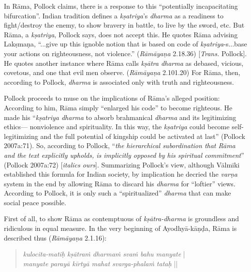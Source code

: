 In Rāma, Pollock claims, there is a response to this “potentially incapacitating bifurcation”. Indian tradition defines a \hbox{{\sl kṣatriya}’s} {\sl dharma} as a readiness to fight/destroy the enemy, to show bravery in battle, to live by the sword, etc. But Rāma, a {\sl kṣatriya}, Pollock says, does not accept this. He quotes Rāma advising Lakṣmaṇa, “...give up this ignoble notion that is based on code of {\sl kṣatriya}-s...base your actions on righteousness, not violence.” ({\sl Rāmāyaṇa} 2.18.36) [{\sl Trans.} Pollock]. He quotes another instance where Rāma calls {\sl kṣātra dharma} as debased, vicious, covetous, and one that evil men observe. ({\sl Rāmāyaṇa} 2.101.20) For Rāma, then, according to Pollock, {\sl dharma} is associated only with truth and righteousness.

Pollock proceeds to muse on the implications of Rāma’s alleged position: According to him, Rāma simply “enlarged his code” to become righteous. He made his “{\sl kṣatriya dharma} to absorb brahmanical {\sl dharma} and its legitimizing ethics--- nonviolence and spirituality. In this way, the {\sl kṣatriya} could become self-legitimizing and the full potential of kingship could be activated at last” (Pollock 2007a:71). So, according to Pollock, “{\sl the hierarchical subordination that Rāma and the text explicitly upholds, is implicitly opposed by his spiritual commitment}” (Pollock 2007a:72) [{\sl italics ours}]. Summarizing Pollock's view, although Vālmīki established this formula for Indian society, by implication he decried the {\sl varṇa} system in the end by allowing Rāma to discard his {\sl dharma} for “loftier” views. According to Pollock, it is only such a “spiritualized” {\sl dharma} that can make social peace possible.

First of all, to show Rāma as contemptuous of {\sl kṣātra-dharma} is groundless and ridiculous in equal measure. In the very beginning of Ayodhyā-kāṇḍa, Rāma is described thus ({\sl Rāmāyaṇa} 2.1.16):
\begin{quote}
{{\sl kulocita-matiḥ kṣātraṁ dharmaṁ svaṁ\label{verse5} bahu manyate}} |\\
{\sl manyate parayā kīrtyā mahat svarga-phalaṁ tataḥ} ||  
\end{quote}

